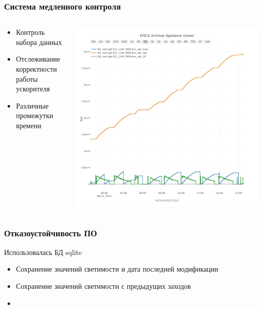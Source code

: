 \documentclass{beamer}
\begin{document}
\begin{frame}
\frametitle{Система медленного контроля}
    \begin{columns}
        \begin{column}{0.5\textwidth}
            \begin{itemize}
                \item Контроль набора данных
                \item Отслеживание корректности работы ускорителя
                \item Различные промежутки времени
            \end{itemize}
        \end{column}
        \begin{column}{0.5\textwidth}
            \includegraphics[width=\textwidth]{Int_lum.jpeg}
        \end{column}
    \end{columns}
\end{frame}


\begin{frame}
\frametitle{Отказоустойчивость ПО}
    Использовалась БД sqlite
    \begin{itemize}
        \item Сохранение значений светимости и дата последней модификации
        \item Сохранение значений светимости с предыдущих заходов
        \item 
    \end{itemize}
\end{frame}
\end{document}
